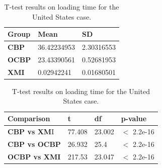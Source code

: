 \documentclass{llncs}
\begin{document}
\begin{table}[ht]
    \centering
    \label{table:ttest_load_time_wikipedia}
    \caption{T-test results on loading time for the United States case.}
    \begin{minipage}{0.44\textwidth}
        \centering
        \begin{tabular}{|p{}|p{}|p{}|}
            \hline 
            \textbf{Group}  & \textbf{Mean} & \textbf{SD} \\ 
            \hline 
            \textbf{CBP} & 36.42234953     & 2.30316553 \\ 
            \hline 
            \textbf{OCBP} & 23.43390561  &  0.52681953 \\ 
            \hline 
            \textbf{XMI} &  0.02942241  & 0.01680501 \\ 
            \hline 
        \end{tabular} 
    \end{minipage}
    \hfill
    \begin{minipage}{0.54\textwidth}
        \centering
          \begin{tabular}{|p{}|p{}|p{}|p{}|}
            \hline 
            \textbf{Comparison} & \textbf{t}  & \textbf{df} & \textbf{p-value} \\ 
            \hline 
            \textbf{CBP vs XM}I &77.408   &23.002 & $<$ 2.2e-16 \\ 
            \hline 
            \textbf{CBP vs OCBP} &  26.932 & 25.4 & $<$ 2.2e-16 \\ 
            \hline 
            \textbf{OCBP vs XMI} & 217.53   & 23.047 & $<$ 2.2e-16 \\ 
            \hline 
        \end{tabular} 
    \end{minipage}
\end{table}
\end{document}
